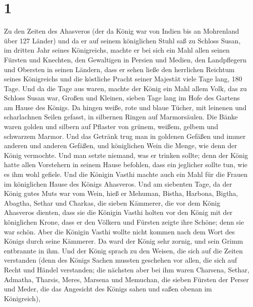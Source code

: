 \hypertarget{section}{%
\section{1}\label{section}}

 Zu den Zeiten des Ahasveros (der da König war von Indien
bis an Mohrenland über 127 Länder)  und da er auf seinem
königlichen Stuhl saß zu Schloss Susan,  im dritten Jahr
seines Königreichs, machte er bei sich ein Mahl allen seinen Fürsten und
Knechten, den Gewaltigen in Persien und Medien, den Landpflegern und
Obersten in seinen Ländern,  dass er sehen ließe den
herrlichen Reichtum seines Königreichs und die köstliche Pracht seiner
Majestät viele Tage lang, 180 Tage.  Und da die Tage aus
waren, machte der König ein Mahl allem Volk, das zu Schloss Susan war,
Großen und Kleinen, sieben Tage lang im Hofe des Gartens am Hause des
Königs.  Da hingen weiße, rote und blaue Tücher, mit
leinenen und scharlachnen Seilen gefasst, in silbernen Ringen auf
Marmorsäulen. Die Bänke waren golden und silbern auf Pflaster von
grünem, weißem, gelbem und schwarzem Marmor.  Und das
Getränk trug man in goldenen Gefäßen und immer anderen und anderen
Gefäßen, und königlichen Wein die Menge, wie denn der König vermochte.
 Und man setzte niemand, was er trinken sollte; denn der
König hatte allen Vorstehern in seinem Hause befohlen, dass ein
jeglicher sollte tun, wie es ihm wohl gefiele.  Und die
Königin Vasthi machte auch ein Mahl für die Frauen im königlichen Hause
des Königs Ahasveros.  Und am siebenten Tage, da der
König gutes Muts war vom Wein, hieß er Mehuman, Bistha, Harbona, Bigtha,
Abagtha, Sethar und Charkas, die sieben Kämmerer, die vor dem König
Ahasveros dienten,  dass sie die Königin Vasthi holten
vor den König mit der königlichen Krone, dass er den Völkern und Fürsten
zeigte ihre Schöne; denn sie war schön.  Aber die Königin
Vasthi wollte nicht kommen nach dem Wort des Königs durch seine
Kämmerer. Da ward der König sehr zornig, und sein Grimm entbrannte in
ihm.  Und der König sprach zu den Weisen, die sich auf
die Zeiten verstanden (denn des Königs Sachen mussten geschehen vor
allen, die sich auf Recht und Händel verstanden;  die
nächsten aber bei ihm waren Charsena, Sethar, Admatha, Tharsis, Meres,
Marsena und Memuchan, die sieben Fürsten der Perser und Meder, die das
Angesicht des Königs sahen und saßen obenan im Königreich),
